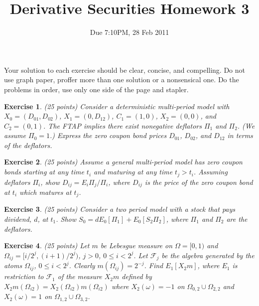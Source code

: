 \documentclass[11pt,fleqn]{amsproc}
\newcommand{\F}{\mathcal{F}}
\newtheorem{xca}{Exercise}
\begin{document}
\title{Derivative Securities Homework 3}
\author{Due 7:10PM, 28 Feb 2011}

\maketitle

Your solution to each exercise should be clear, concise, and compelling.
Do not use graph paper, proffer more than one solution or a nonsensical one.
Do the problems in order, use only one side of the page and stapler.

\begin{xca}{(25 points)}
Consider a deterministic multi-period model with $X_0 = (D_{01}, D_{02})$,
$X_1 = (0, D_{12})$, $C_1 = (1, 0)$, $X_2 = (0, 0)$, and $C_2 = (0, 1)$.
The FTAP implies there exist nonegative deflators $\Pi_1$ and $\Pi_2$. (We
assume $\Pi_0 = 1$.) Express the zero coupon bond prices $D_{01}$,
$D_{02}$, and $D_{12}$ in terms of the deflators.

\end{xca}

\begin{xca}{(25 points)}
Assume a general multi-period model has zero coupon bonds starting
at any time $t_i$ and maturing at any time $t_j > t_i$. Assuming
deflators $\Pi_i$, show $D_{ij} = E_i \Pi_j/\Pi_i$, where $D_{ij}$ is the
price of the zero coupon bond at $t_i$ which matures at $t_j$.
\end{xca}

\begin{xca}{(25 points)}
Consider a two period model with a stock that pays dividend, $d$, at $t_1$.
Show $S_0 = dE_0[\Pi_1] + E_0[S_2\Pi_2]$, where $\Pi_1$ and
$\Pi_2$ are the deflators.

\end{xca}

\begin{xca}{(25 points)}
Let $m$ be Lebesgue measure on $\Omega = [0, 1)$ and $\Omega_{ij}
= [i/2^j, (i + 1)/2^j)$, $j > 0$, $0 \le i < 2^j$.  Let $\F_j$
be the algebra generated by the atoms $\Omega_{ij}$, $0\le i <
2^j$. Clearly $m(\Omega_{ij}) = 2^{-j}$. Find $E_1[X_2m]$, where
$E_1$ is restriction to $\F_1$ of the measure $X_2m$ defined by
$X_2m(\Omega_{i2}) = X_2(\Omega_{i2})m(\Omega_{i2})$ where $X_2(\omega)
= -1$ on $\Omega_{0,2}\cup\Omega_{2,2}$ and $X_2(\omega) = 1$ on
$\Omega_{1,2}\cup\Omega_{3,2}$.

\end{xca}
\end{document}
